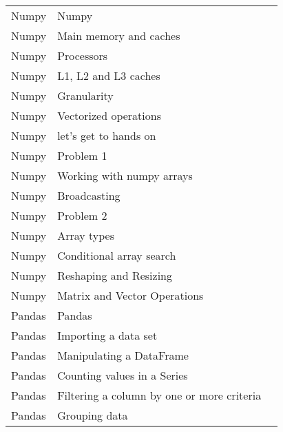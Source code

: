 \documentclass[10pt,a4paper]{article}
\begin{document}
\begin{landscape}
\begin{longtable}{|l|l|l|}
Numpy & Numpy & \cite{mayer2020oneliners} \\
    Numpy & Main memory and caches & \cite{herlihy20211} \\
    Numpy & Processors & \cite{herlihy20211} \\
    Numpy & L1, L2 and L3 caches & \cite{robey2021parallel} \\
    Numpy & Granularity & \cite{herlihy20211} \\
    Numpy & Vectorized operations & \cite{robey2021parallel} \\
    Numpy & let's get to hands on & \cite{mayer2020oneliners} \\
    Numpy & Problem 1 & \cite{mayer2020oneliners} \\
    Numpy & Working with numpy arrays & \cite{mayer2020oneliners} \\
    Numpy & Broadcasting & \cite{mayer2020oneliners} \\
    Numpy & Problem 2 & \cite{mayer2020oneliners} \\
    Numpy & Array types & \cite{mayer2020oneliners} \\
    Numpy & Conditional array search & \cite{mayer2020oneliners} \\
    Numpy & Reshaping and Resizing & \cite{johansson10numerical} \\
    Numpy & Matrix and Vector Operations & \cite{johansson10numerical} \\
    
Pandas & Pandas & \cite{paskhaver2021pandas} \\
    Pandas & Importing a data set & \cite{paskhaver2021pandas} \\
    Pandas & Manipulating a DataFrame & \cite{paskhaver2021pandas} \\
    Pandas & Counting values in a Series & \cite{paskhaver2021pandas} \\
    Pandas & Filtering a column by one or more criteria & \cite{paskhaver2021pandas} \\
    Pandas & Grouping data & \cite{paskhaver2021pandas} \\
    

\end{longtable}
\end{landscape}

\restoregeometry


\end{document}
